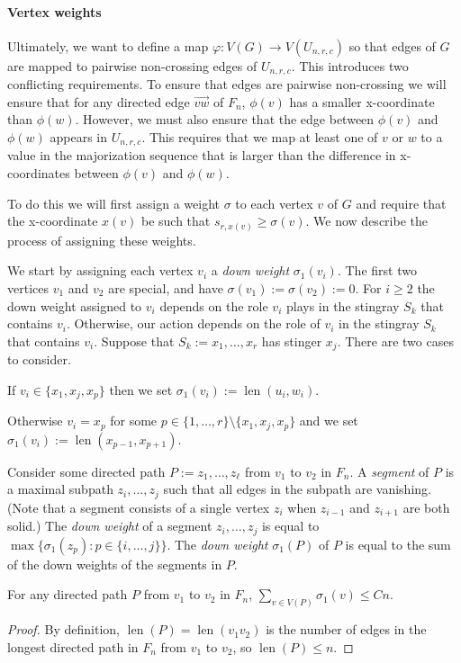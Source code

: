 \documentclass{patmorin}
\newcommand{\defin}[1]{\emph{\color{brightmaroon}#1}}
\DeclareMathOperator{\len}{len}
\begin{document}
\paragraph{Vertex weights}

Ultimately, we want to define a map $\varphi:V(G)\to V(U_{n,r,c})$ so that edges of $G$ are mapped to pairwise non-crossing edges of $U_{n,r,c}$.  This introduces two conflicting requirements. To ensure that edges are pairwise non-crossing we will ensure that for any directed edge $\overrightarrow{vw}$ of $F_n$, $\phi(v)$ has a smaller x-coordinate than $\phi(w)$.   However, we must also ensure that the edge between $\phi(v)$ and $\phi(w)$ appears in $U_{n,r,c}$. This requires that we map at least one of $v$ or $w$ to a value in the majorization sequence that is larger than the difference in x-coordinates between $\phi(v)$ and $\phi(w)$.

To do this we will first assign a weight $\sigma$ to each vertex $v$ of $G$ and require that the x-coordinate $x(v)$ be such that $s_{r,x(v)} \ge \sigma(v)$.  We now describe the process of assigning these weights.

We start by assigning each vertex $v_i$ a \defin{down weight} $\sigma_1(v_i)$. The first two vertices $v_1$ and $v_2$ are special, and have $\sigma(v_1):=\sigma(v_2):=0$.  For $i\ge 2$ the down weight assigned to $v_i$ depends on the role $v_i$ plays in the stingray $S_k$ that contains $v_i$.  Otherwise, our action depends on the role of $v_i$ in the stingray $S_k$ that contains $v_i$.  Suppose that $S_k:=x_1,\ldots,x_r$ has stinger $x_j$.  There are two cases to consider.
\begin{compactenum}
  \item If $v_i\in\{x_1,x_j,x_p\}$ then we set $\sigma_1(v_i):=\len(u_i,w_i)$.

  \item Otherwise $v_i=x_p$ for some $p\in\{1,\ldots,r\}\setminus\{x_1,x_j,x_p\}$ and we set $\sigma_1(v_i):=\len(x_{p-1},x_{p+1})$.
\end{compactenum}

Consider some directed path $P:=z_1,\ldots,z_\ell$ from $v_1$ to $v_2$ in $F_n$.  A \defin{segment} of $P$ is a maximal subpath $z_i,\ldots,z_j$ such that all edges in the subpath are vanishing.  (Note that a segment consists of a single vertex $z_i$ when $z_{i-1}$ and $z_{i+1}$ are both solid.) The \defin{down weight} of a segment $z_i,\ldots,z_j$ is equal to $\max\{\sigma_1(z_p):p\in\{i,\ldots,j\}\}$.  The \defin{down weight} $\sigma_1(P)$ of $P$ is equal to the sum of the down weights of the segments in $P$.



\begin{lem}
  For any directed path $P$ from $v_1$ to $v_2$ in $F_n$, $\sum_{v\in V(P)} \sigma_1(v) \le Cn$.
\end{lem}

\begin{proof}
  By definition, $\len(P)=\len(v_1v_2)$ is the number of edges in the longest directed path in $F_n$ from $v_1$ to $v_2$, so $\len(P)\le n$.
\end{proof}
\end{document}
